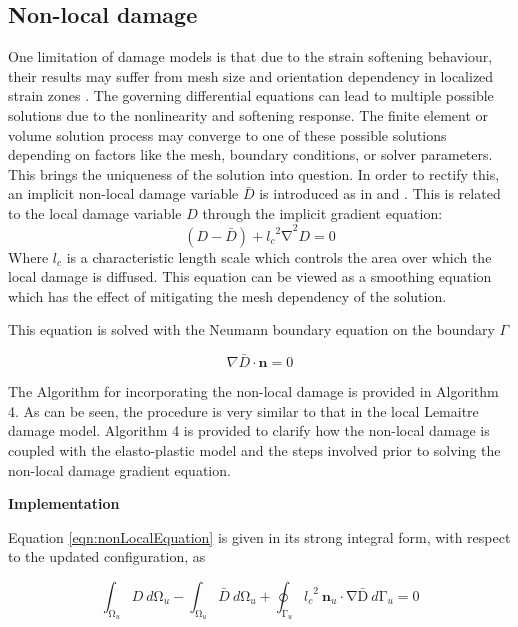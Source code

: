 \documentclass[sn-mathphys,Numbered,draft]{sn-jnl}%
\begin{document}
\subsection{Non-local damage}

One limitation of damage models is that due to the strain softening behaviour, their results may suffer from mesh size and orientation dependency in localized strain zones \cite{peerlings_critical_2001,peerlings_localisation_2002,geers_strongly_2003}. The governing differential equations can lead to multiple possible solutions due to the nonlinearity and softening response. The finite element or volume solution process may converge to one of these possible solutions depending on factors like the mesh, boundary conditions, or solver parameters. This brings the uniqueness of the solution into question. In order to rectify this, an implicit non-local damage variable $\bar{D}$ is introduced as in \citet{peerlings_critical_2001, peerlings_localisation_2002} and \citet{geers_strongly_2003}. This is related to the local damage variable $D$ through the implicit gradient equation:
\begin{equation}
\label{eqn:nonLocalEquation}
	\left(D-\bar{D}\right)+{{l_c}^2\mathrm{\nabla}}^2D=0	
\end{equation}
Where $l_c$ is a characteristic length scale which controls the area over which the local damage is diffused. This equation can be viewed as a smoothing equation which has the effect of mitigating the mesh dependency of the solution.

This equation is solved with the Neumann boundary equation on the boundary $\Gamma$

\begin{equation}
    \nabla \bar{D}\cdot\textbf{n}=0 
\end{equation}

The Algorithm for incorporating the non-local damage is provided in Algorithm 4. As can be seen, the procedure is very similar to that in the local Lemaitre damage model. Algorithm 4 is provided to clarify how the non-local damage is coupled with the elasto-plastic model and the steps involved prior to solving the non-local damage gradient equation.

\textbf{Implementation}

Equation \ref{eqn:nonLocalEquation} is given in its strong integral form, with respect to the updated configuration, as

\begin{equation}
\int_{\mathrm{\Omega}_u}D\ d\mathrm{\Omega}_u-\int_{\mathrm{\Omega}_u}\bar{D}\ d\mathrm{\Omega}_u+\oint_{\mathrm{\Gamma}_u}{{l_c}^2\ \mathbf{n}_u\cdot\mathrm{\nabla}\mathrm{\bar{D}}}\ d\mathrm{\Gamma}_u=0
\end{equation}
\end{document}
